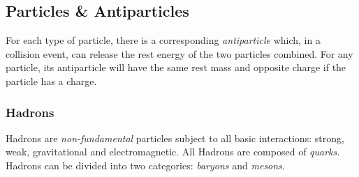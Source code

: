 \documentclass[12pt]{article}
\begin{document}
\subsection{Particles \& Antiparticles}
\label{sec:orgddd515d}

For each type of particle, there is a corresponding \emph{antiparticle} which, in a collision event, can release the rest energy of the two particles combined. For any particle, its antiparticle will have the same rest mass and opposite charge if the particle has a charge.

\subsubsection{Hadrons}
\label{sec:org62ceddf}

Hadrons are \emph{non-fundamental} particles subject to all basic interactions: strong, weak, gravitational and electromagnetic. All Hadrons are composed of \emph{quarks.} Hadrons can be divided into two categories: \emph{baryons} and \emph{mesons}.
\end{document}
